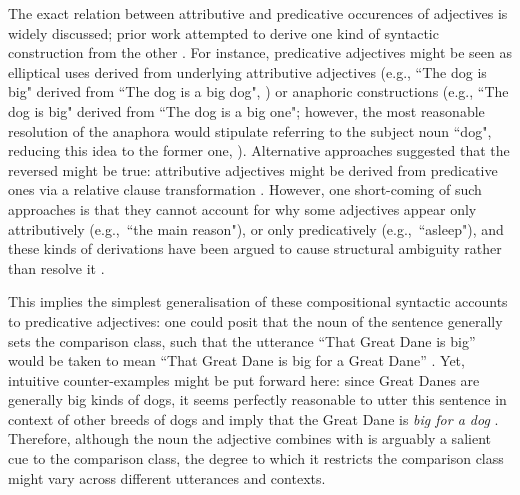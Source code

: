 The exact relation between attributive and predicative occurences of adjectives is widely discussed; prior work attempted to derive one kind of syntactic construction from the other \parencite[e.g.,][]{Cresswell1976}. For instance, predicative adjectives might be seen as elliptical uses derived from underlying attributive adjectives (e.g., ``The dog is big" derived from ``The dog is a big dog", \textcite[cf.][]{Kamp1975}) or anaphoric constructions (e.g., ``The dog is big" derived from ``The dog is a big one"; however, the most reasonable resolution of the anaphora would stipulate referring to the subject noun ``dog", reducing this idea to the former one, \textcite[cf.][]{goldberg2017one}). 
Alternative approaches suggested that the reversed might be true: attributive adjectives might be derived from predicative ones via a relative clause transformation \parencite[``I bought the table. The table was big. $\rightarrow$ I bought the table that was big. $\rightarrow$ I bought the table big. $\rightarrow$ I bought the big table."; cf.][p. 2]{bolinger1967adjectives}. However, one short-coming of such approaches is that they cannot account for why some adjectives appear only attributively (e.g.,~``the main reason"), or only predicatively (e.g.,~``asleep"), and these kinds of derivations have been argued to cause structural ambiguity rather than resolve it \parencite{bolinger1967adjectives}.

This implies the simplest generalisation of these compositional syntactic accounts to predicative adjectives: one could posit that the noun of the sentence generally sets the comparison class, such that the utterance “That Great Dane is big” would be taken to mean “That Great Dane is big for a Great Dane” \parencite{tessler2020}. Yet, intuitive counter-examples might be put forward here: since Great Danes are generally big kinds of dogs, it seems perfectly reasonable to utter this sentence in context of other breeds of dogs and imply that the Great Dane is \emph{big for a dog} \parencite{tessler2017warm}. 
Therefore, although the noun the adjective combines with is arguably a salient cue to the comparison class, the degree to which it restricts the comparison class might vary across different utterances and contexts.   

